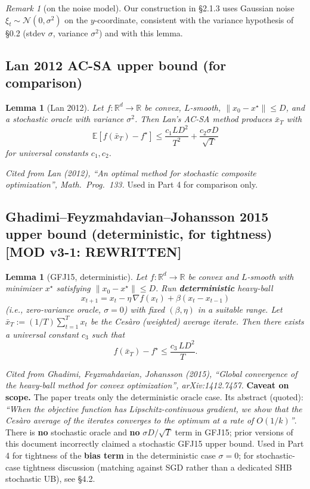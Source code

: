 \documentclass[11pt,a4paper]{article}
\theoremstyle{plain}
\newtheorem{lemma}[theorem]{Lemma}
\theoremstyle{definition}
\theoremstyle{remark}
\newtheorem{remark}[theorem]{Remark}
\newcommand{\R}{\mathbb{R}}
\newcommand{\E}{\mathbb{E}}
\begin{document}
\begin{remark}[on the noise model]
Our construction in \S2.1.3 uses Gaussian noise $\xi_t \sim \mathcal{N}(0, \sigma^2)$ on the $y$-coordinate, consistent with the variance hypothesis of \S0.2 (stdev $\sigma$, variance $\sigma^2$) and with this lemma.
\end{remark}

\subsection{Lan 2012 AC-SA upper bound (for comparison)}

\begin{lemma}[Lan 2012]
\label{lem:1.5}
Let $f : \R^d \to \R$ be convex, $L$-smooth, $\|x_0 - x^\star\|\leq D$, and a stochastic oracle with variance $\sigma^2$. Then Lan's AC-SA method produces $\bar x_T$ with
\[
\E[f(\bar x_T) - f^\star] \leq \frac{c_1 L D^2}{T^2} + \frac{c_2 \sigma D}{\sqrt T}
\]
for universal constants $c_1, c_2$.
\end{lemma}

\emph{Cited from Lan (2012), ``An optimal method for stochastic composite optimization'', Math.\ Prog.\ 133.} Used in Part 4 for comparison only.

\subsection{Ghadimi--Feyzmahdavian--Johansson 2015 upper bound (deterministic, for tightness) \textbf{[MOD v3-1: REWRITTEN]}}

\begin{lemma}[GFJ15, deterministic]
\label{lem:1.6}
Let $f:\R^d \to \R$ be convex and $L$-smooth with minimizer $x^\star$ satisfying $\|x_0 - x^\star\|\leq D$. Run \textbf{deterministic} heavy-ball
\[
x_{t+1} = x_t - \eta\,\nabla f(x_t) + \beta(x_t - x_{t-1})
\]
(i.e., zero-variance oracle, $\sigma = 0$) with fixed $(\beta,\eta)$ in a suitable range. Let $\bar x_T := (1/T)\sum_{t=1}^T x_t$ be the Ces\`aro (weighted) average iterate. Then there exists a universal constant $c_3$ such that
\[
f(\bar x_T) - f^\star \leq \frac{c_3\, L D^2}{T}.
\]
\end{lemma}

\emph{Cited from Ghadimi, Feyzmahdavian, Johansson (2015), ``Global convergence of the heavy-ball method for convex optimization'', arXiv:1412.7457.} \textbf{Caveat on scope.} The paper treats only the deterministic oracle case. Its abstract (quoted): \emph{``When the objective function has Lipschitz-continuous gradient, we show that the Ces\`aro average of the iterates converges to the optimum at a rate of $O(1/k)$''}. There is \textbf{no} stochastic oracle and \textbf{no} $\sigma D/\sqrt T$ term in GFJ15; prior versions of this document incorrectly claimed a stochastic GFJ15 upper bound. Used in Part 4 for tightness of the \textbf{bias term} in the deterministic case $\sigma = 0$; for stochastic-case tightness discussion (matching against SGD rather than a dedicated SHB stochastic UB), see \S4.2.
\end{document}
